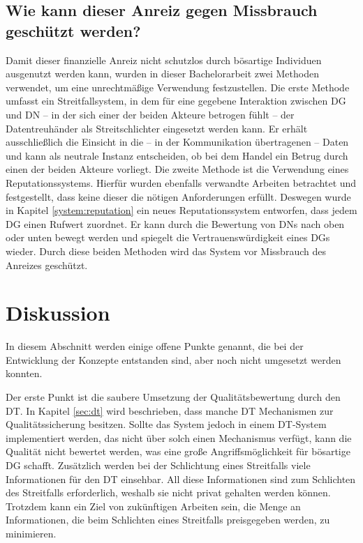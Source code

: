 \documentclass[
	fontsize=11pt,
	headings=small,
	parskip=half,           %
	bibliography=totoc,
	numbers=noenddot,       %
	open=any,               %
]{scrreprt}
\begin{document}
\subsection{Wie kann dieser Anreiz gegen Missbrauch geschützt werden?}
Damit dieser finanzielle Anreiz nicht schutzlos durch bösartige Individuen ausgenutzt werden kann, wurden in dieser Bachelorarbeit zwei Methoden verwendet, um eine unrechtmäßige Verwendung festzustellen. Die erste Methode umfasst ein Streitfallsystem, in dem für eine gegebene Interaktion zwischen DG und DN -- in der sich einer der beiden Akteure betrogen fühlt -- der Datentreuhänder als Streitschlichter eingesetzt werden kann. Er erhält ausschließlich die Einsicht in die -- in der Kommunikation übertragenen -- Daten und kann als neutrale Instanz entscheiden, ob bei dem Handel ein Betrug durch einen der beiden Akteure vorliegt. Die zweite Methode ist die Verwendung eines Reputationssystems. Hierfür wurden ebenfalls verwandte Arbeiten betrachtet und festgestellt, dass keine dieser die nötigen Anforderungen erfüllt. Deswegen wurde in Kapitel \ref{system:reputation} ein neues Reputationssystem entworfen, dass jedem DG einen Rufwert zuordnet. Er kann durch die Bewertung von DNs nach oben oder unten bewegt werden und spiegelt die Vertrauenswürdigkeit eines DGs wieder. Durch diese beiden Methoden wird das System vor Missbrauch des Anreizes geschützt.
\section{Diskussion}
\label{sec:discussion}
In diesem Abschnitt werden einige offene Punkte genannt, die bei der Entwicklung der Konzepte entstanden sind, aber noch nicht umgesetzt werden konnten. 

Der erste Punkt ist die saubere Umsetzung der Qualitätsbewertung durch den DT. In Kapitel \ref{sec:dt} wird beschrieben, dass manche DT Mechanismen zur Qualitätssicherung besitzen. Sollte das System jedoch in einem DT-System implementiert werden, das nicht über solch einen Mechanismus verfügt, kann die Qualität nicht bewertet werden, was eine große Angriffsmöglichkeit für bösartige DG schafft. Zusätzlich werden bei der Schlichtung eines Streitfalls viele Informationen für den DT einsehbar. All diese Informationen sind zum Schlichten des Streitfalls erforderlich, weshalb sie nicht privat gehalten werden können. Trotzdem kann ein Ziel von zukünftigen Arbeiten sein, die Menge an Informationen, die beim Schlichten eines Streitfalls preisgegeben werden, zu minimieren.
\end{document}
